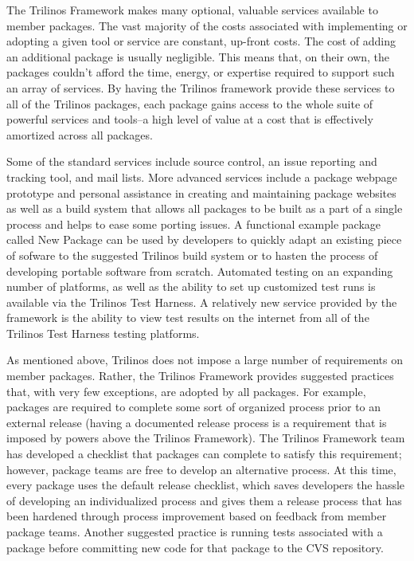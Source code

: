 \documentclass[12pt,relax]{article}
\begin{document}
The Trilinos Framework makes many optional, valuable services available to
member packages.  The vast majority of the costs associated with implementing
or adopting a given tool or service are constant, up-front costs.  The cost of
adding an additional package is usually negligible.  This means that, on their
own, the packages couldn't afford the time, energy, or expertise required to
support such an array of services.  By having the Trilinos framework
provide these services to all of the Trilinos packages, each package gains
access to the whole suite of powerful services and tools--a high level of value
at a cost that is effectively amortized across all packages.

Some of the standard services include source control, an issue reporting and
tracking tool, and mail lists.  More advanced services include a package
webpage prototype and personal assistance in creating and maintaining package
websites as well as a build system that allows all packages to be built as a
part of a single process and helps to ease some porting issues.  A functional
example package called New Package can be used by developers to quickly adapt
an existing piece of sofware to the suggested Trilinos build system or to 
hasten the process of developing portable software from scratch.  Automated 
testing on an expanding number of platforms, as well as the ability to set up 
customized test runs is available via the Trilinos Test Harness.  A relatively 
new service provided by  the framework is the ability to view test results 
on the internet from all of the Trilinos Test Harness testing platforms.

As mentioned above, Trilinos does not impose a large number of requirements
on member packages.  Rather, the Trilinos Framework provides suggested 
practices that, with very few exceptions, are adopted by all packages.
For example, packages are required to complete some sort of organized
process prior to an external release (having a documented release
process is a requirement that is imposed by powers above the Trilinos
Framework).  The Trilinos Framework team has developed a checklist that
packages can complete to satisfy this requirement; however, package teams
are free to develop an alternative process.  At this time, every package
uses the default release checklist, which saves developers the hassle of
developing an individualized process and gives them a release process that
has been hardened through process improvement based on feedback from
member package teams.  Another suggested practice is running tests
associated with a package before committing new code for that package to the 
CVS repository.
\end{document}

